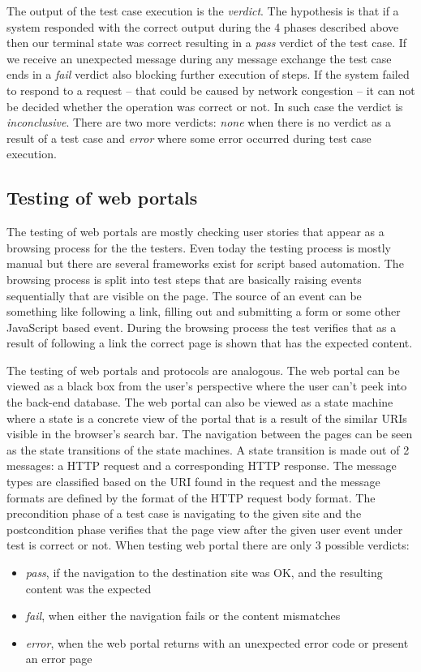 \documentclass[a4paper]{article}
\begin{document}
The output of the test case execution is the \emph{verdict}. The hypothesis is that if a system responded with the
correct output during the 4 phases described above then our terminal state was correct resulting in a \emph{pass}
verdict of the test case. If we receive an unexpected message during any message exchange the test case ends in a
\emph{fail} verdict also blocking further execution of steps. If the system failed to respond to a request -- that
could be caused by network congestion -- it can not be decided whether the operation was correct or not. In such case
the verdict is \emph{inconclusive}. There are two more verdicts: \emph{none} when there is no verdict as a result of a
test case and \emph{error} where some error occurred during test case execution.

\subsection{Testing of web portals}

The testing of web portals are mostly checking user stories that appear as a browsing process for the the testers. Even
today the testing process is mostly manual but there are several frameworks exist for script based automation. The
browsing process is split into test steps that are basically raising events sequentially that are visible on the page.
The source of an event can be something like following a link, filling out and submitting a form or some other
JavaScript based event. During the browsing process the test verifies that as a result of following a link the correct
page is shown that has the expected content.

The testing of web portals and protocols are analogous. The web portal can be viewed as a black box from the user's
perspective where the user can't peek into the back-end database. The web portal can also be viewed as a state machine
where a state is a concrete view of the portal that is a result of the similar URIs visible in the browser's search
bar. The navigation between the pages can be seen as the state transitions of the state machines. A state transition is
made out of 2 messages: a HTTP request and a corresponding HTTP response. The message types are classified based on the
URI found in the request and the message formats are defined by the format of the HTTP request body format. The
precondition phase of a test case is navigating to the given site  and the postcondition phase verifies that the page
view after the given user event under test is correct or not.
When testing web portal there are only 3 possible verdicts:
\begin{itemize}
    \item \emph{pass}, if the navigation to the destination site was OK, and the resulting content was the expected
    \item \emph{fail}, when either the navigation fails or the content mismatches
    \item \emph{error}, when the web portal returns with an unexpected error code or present an error page
\end{itemize}
\end{document}
